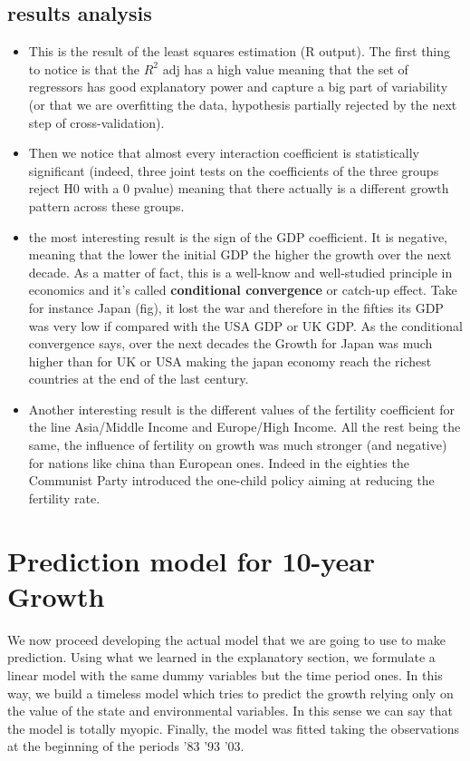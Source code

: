 \documentclass[11pt,a4paper]{article}
\begin{document}
\subsection{results analysis}
\begin{itemize}
	\item This is the result of the least squares estimation (R output).
	The first thing to notice is that the $R^2$ adj  has a high value meaning that the set of regressors has good explanatory power and capture a big part of variability (or that we are overfitting the data, hypothesis partially rejected by the next step of cross-validation).
	\item Then we notice that almost every interaction coefficient is statistically significant (indeed, three joint tests on the coefficients of the three groups reject H0 with a 0 pvalue) meaning that there actually is a different growth pattern across these groups.
	\item the most interesting result is the sign of the GDP coefficient. It is negative, meaning that the lower the initial GDP the higher the growth over the next decade. As a matter of fact, this is a well-know and well-studied principle in economics and it's called \textbf{conditional convergence} or catch-up effect. Take for instance Japan (fig), it lost the war and therefore in the fifties  its GDP was very low if compared  with the USA GDP or UK GDP. As the conditional convergence says, over the next decades the Growth for Japan was much higher than for UK or USA making the japan economy reach the richest countries at the end of the last century.
	
	\item Another interesting result is the different values of the fertility coefficient for the line Asia/Middle Income and Europe/High Income. All the rest being the same, the influence of fertility on growth was much stronger (and negative) for nations like china than European ones. Indeed in the eighties the Communist Party introduced the one-child policy aiming at reducing the fertility rate.
	
	
\end{itemize}


\section{Prediction model for 10-year Growth}
We now proceed  developing the actual model  that we are going to use to make prediction. Using what we learned in the explanatory section, we formulate a linear model with the same dummy variables but the time period ones. In this way, we build a timeless model  which tries to predict the growth relying only on the value of the state and environmental variables. In this sense we can say that the model is totally myopic. Finally, the model was fitted taking the observations at the beginning of the periods '83 '93 '03.
\end{document}
